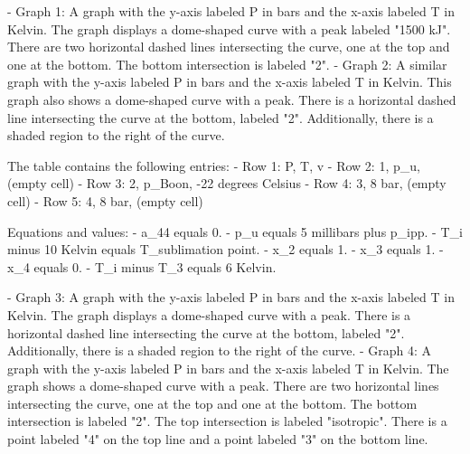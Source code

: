 - Graph 1: A graph with the y-axis labeled P in bars and the x-axis labeled T in Kelvin. The graph displays a dome-shaped curve with a peak labeled "1500 kJ". There are two horizontal dashed lines intersecting the curve, one at the top and one at the bottom. The bottom intersection is labeled "2".
- Graph 2: A similar graph with the y-axis labeled P in bars and the x-axis labeled T in Kelvin. This graph also shows a dome-shaped curve with a peak. There is a horizontal dashed line intersecting the curve at the bottom, labeled "2". Additionally, there is a shaded region to the right of the curve.

The table contains the following entries:
- Row 1: P, T, v
- Row 2: 1, p_u, (empty cell)
- Row 3: 2, p_Boon, -22 degrees Celsius
- Row 4: 3, 8 bar, (empty cell)
- Row 5: 4, 8 bar, (empty cell)

Equations and values:
- a_44 equals 0.
- p_u equals 5 millibars plus p_ipp.
- T_i minus 10 Kelvin equals T_sublimation point.
- x_2 equals 1.
- x_3 equals 1.
- x_4 equals 0.
- T_i minus T_3 equals 6 Kelvin.

- Graph 3: A graph with the y-axis labeled P in bars and the x-axis labeled T in Kelvin. The graph displays a dome-shaped curve with a peak. There is a horizontal dashed line intersecting the curve at the bottom, labeled "2". Additionally, there is a shaded region to the right of the curve.
- Graph 4: A graph with the y-axis labeled P in bars and the x-axis labeled T in Kelvin. The graph shows a dome-shaped curve with a peak. There are two horizontal lines intersecting the curve, one at the top and one at the bottom. The bottom intersection is labeled "2". The top intersection is labeled "isotropic". There is a point labeled "4" on the top line and a point labeled "3" on the bottom line.